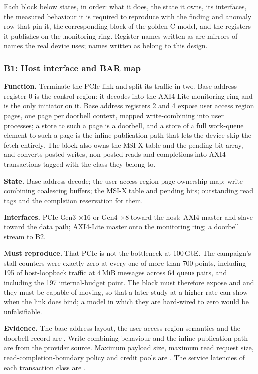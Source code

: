 Each block below states, in order: what it does, the state it owns, its
interfaces, the measured behaviour it is required to reproduce with the finding
and anomaly row that pin it, the corresponding block of the golden C model, and
the registers it publishes on the monitoring ring. Register names written as
 are mirrors of names the real device uses; names written as
 belong to this design.

\subsubsection{B1: Host interface and BAR map}

\textbf{Function.} Terminate the PCIe link and split its traffic in two. Base
address register 0 is the control region: it decodes into the AXI4-Lite
monitoring ring and is the only initiator on it. Base address registers 2 and 4
expose user access region pages, one page per doorbell context, mapped
write-combining into user processes; a store to such a page is a doorbell, and
a store of a full work-queue element to such a page is the inline publication
path that lets the device skip the fetch entirely. The block also owns the
MSI-X table and the pending-bit array, and converts posted writes, non-posted
reads and completions into AXI4 transactions tagged with the class they belong
to.

\textbf{State.} Base-address decode; the user-access-region page ownership map;
write-combining coalescing buffers; the MSI-X table and pending bits;
outstanding read tags and the completion reservation for them.

\textbf{Interfaces.} PCIe Gen3 $\times 16$ or Gen4 $\times 8$ toward the host;
AXI4 master and slave toward the data path; AXI4-Lite master onto the
monitoring ring; a doorbell stream to B2.

\textbf{Must reproduce.} That PCIe is not the bottleneck at 100\,GbE. The
campaign's stall counters were exactly zero at every one of more than 700
points, including 195\Gbps{} of host-loopback traffic at 4\,MiB messages across
64 queue pairs, and including the 197\Gbps{} internal-budget point. The block
must therefore expose  and
 and they must be capable of moving, so that a
later study at a higher rate can show when the link does bind; a model in which
they are hard-wired to zero would be unfalsifiable.

\textbf{Evidence.} The base-address layout, the user-access-region semantics and
the doorbell record are \evdoc{}. Write-combining behaviour and the inline
publication path are \evdrv{} from the provider source. Maximum payload size,
maximum read request size, read-completion-boundary policy and credit pools are
\evdoc{}. The service latencies of each transaction class are \evcal{}.

